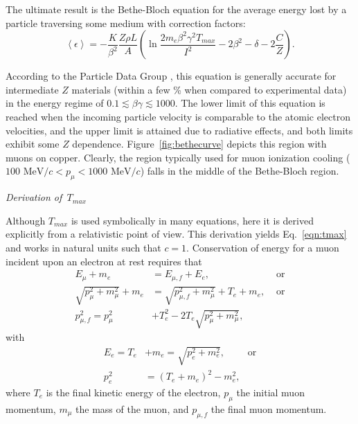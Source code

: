 The ultimate result is the Bethe-Bloch equation for the average energy lost by a particle traversing some medium with correction factors:
\begin{equation}\label{eqn:bethebloch}
\left< \epsilon \right> = -\frac{K}{\beta^2}\frac{Z\rho L}{A}\left(\ln{\frac{2m_e \beta ^2 \gamma ^2 T_{max}}{I^2}}-2\beta^2-\delta-2\frac{C}{Z}\right).
\end{equation}

According to the Particle Data Group \cite{PDG}, this equation is generally accurate for intermediate $Z$ materials (within a few \% when compared to experimental data) in the energy regime of $0.1 \lesssim \beta \gamma \lesssim 1000$. The lower limit of this equation is reached when the incoming particle velocity is comparable to the atomic electron velocities, and the upper limit is attained due to radiative effects, and both limits exhibit some $Z$ dependence. Figure~\ref{fig:bethecurve} depicts this region with muons on copper. Clearly, the region typically used for muon ionization cooling ($100 \text{ MeV/}c < p_\mu < 1000 \text{ MeV/}c$) falls in the middle of the Bethe-Bloch region.

\vspace{24pt}
\newpage %
\noindent \textit{\large{Derivation of $\,T_{max}$}}

Although $T_{max}$ is used symbolically in many equations, here it is derived explicitly from a relativistic point of view. This derivation yields Eq.~\eqref{eqn:tmax} and works in natural units such that $c=1$. Conservation of energy for a muon incident upon an electron at rest requires that 
\begin{align}
E_\mu+m_e&=E_{\mu,f}+E_e,&\text{ or} \nonumber\\
\sqrt{p_\mu ^2+m_\mu ^2}+m_e &= \sqrt{p_{\mu,f}^2+m_\mu ^2}+T_e+m_e,&\text{ or} \nonumber \\
p_{\mu,f}^2 =p_\mu^2 &+T_e^2-2T_e\sqrt{p_\mu ^2 + m_\mu^2}, \label{eqn:TMaxEnergy1}
\end{align}
with
\begin{align}
E_e=T_e&+m_e = \sqrt{p_e ^2+m_e^2},\qquad\text{ or} \nonumber\\
p_e ^2&=(T_e+m_e)^2-m_e^2, \label{eqn:TMaxEnergy2}
\end{align}
where $T_e$ is the final kinetic energy of the electron, $p_\mu$ the initial muon momentum, $m_\mu$ the mass of the muon, and $p_{\mu,f}$ the final muon momentum. 

